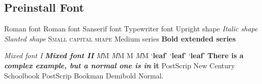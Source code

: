 \documentclass{article}
\begin{document}
        \subsection{Preinstall Font}
            \textrm{Roman font}\newline
            {\rmfamily Roman font}\newline              %
            {\sffamily Sanserif font}\newline           %
            {\ttfamily Typewriter font}\newline         %
            {\upshape Upright shape}\newline            %
            {\itshape Italic shape}\newline             %
            {\slshape Slanted shape}\newline            %
            {\scshape Small capital shape}\newline      %
            {\mdseries Medium series}\newline           %
            {\bfseries Bold extended series}\newline    %
            
            {\rmfamily\slshape\mdseries Mixed font I}\newline
            \textsf\textit\textbf{Mixed font II}\newline    %
            {\itshape M}M \quad \textit{M}M M\newline
            \textit{M\nocorr}M\newline         %
            `{\bfseries leaf}' \quad `{\bfseries leaf\/}' \quad `\textbf{leaf}'\newline
            {\sffamily \textbf{There is a \textit{complex example, 
            but \textnormal{a normal one} is in} it}}\newline
            {\fontsize{14}{17}
            \selectfont PostScrip New Century Schoolbook}\newline
            { PostScrip Bookman Demibold Normal. }
                
\end{document}

